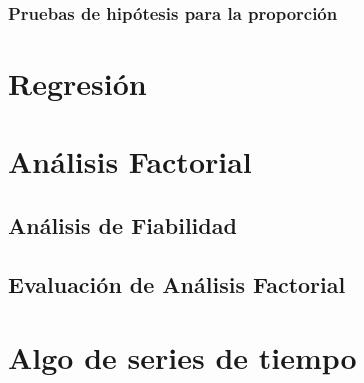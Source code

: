 \documentclass[]{book}
\begin{document}
\subsection{Pruebas de hipótesis para la
proporción}\label{pruebas-de-hipotesis-para-la-proporcion}

\chapter{Regresión}\label{methods}

\chapter{Análisis Factorial}\label{analisis-factorial}

\section{Análisis de Fiabilidad}\label{analisis-de-fiabilidad}

\section{Evaluación de Análisis
Factorial}\label{evaluacion-de-analisis-factorial}

\chapter{Algo de series de tiempo}\label{algo-de-series-de-tiempo}


\end{document}
